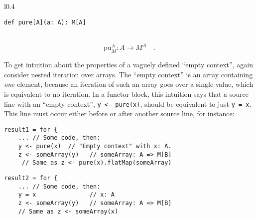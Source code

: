 \begin{wrapfigure}{l}{0.4\columnwidth}%
\vspace{-0.8\baselineskip}
\begin{lstlisting}
def pure[A](a: A): M[A]
\end{lstlisting}
\vspace{-0.6\baselineskip}
\end{wrapfigure}%

~\vspace{-0.5\baselineskip}
\[
\text{pu}_{M}^{A}:A\rightarrow M^{A}\quad.
\]

To get intuition about the properties of a vaguely defined \textsf{``}empty
context\textsf{''}, again consider nested iteration over arrays. The \textsf{``}empty
context\textsf{''} is an array containing \emph{one} element, because an iteration
of such an array goes over a single value, which is equivalent to
no iteration. In a functor block, this intuition says that a source
line with an \textsf{``}empty context\textsf{''}, \lstinline!y <- pure(x)!, should
be equivalent to just \lstinline!y = x!. This line must occur either
before or after another source line, for instance:

\begin{comment}
So, we need to examine two possibilities: first, an empty context
comes before another source line,
\end{comment}

\noindent \texttt{\textcolor{blue}{\footnotesize{}}}%
\begin{minipage}[c]{0.475\columnwidth}%
\texttt{\textcolor{blue}{\footnotesize{}}}
\begin{lstlisting}
result1 = for {
    ... // Some code, then:
    y <- pure(x)  // "Empty context" with x: A.
    z <- someArray(y)   // someArray: A => M[B]
     // Same as z <- pure(x).flatMap(someArray)
\end{lstlisting}
%
\end{minipage}\texttt{\textcolor{blue}{\footnotesize{}\hspace*{\fill}}}%
\begin{minipage}[c]{0.475\columnwidth}%
\texttt{\textcolor{blue}{\footnotesize{}}}
\begin{lstlisting}
result2 = for {
    ... // Some code, then:
    y = x               // x: A
    z <- someArray(y)   // someArray: A => M[B]
    // Same as z <- someArray(x)
\end{lstlisting}
%
\end{minipage}{\footnotesize\par}

